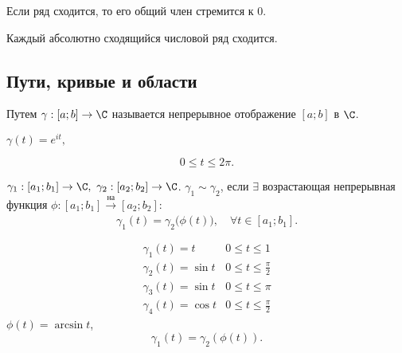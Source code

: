 \begin{corollary}
	Если ряд сходится, то его общий член стремится к $0$.
\end{corollary}

\begin{corollary}
	Каждый абсолютно сходящийся числовой ряд сходится.
\end{corollary}

\subsection{Пути, кривые и области}

\begin{definition}[Путь]
	Путем $\gamma:[a ; b] \rightarrow \C$ называется непрерывное отображение $[a ; b]$ в $\C$.
\end{definition}

\begin{eg}
	$\gamma(t) = e^{it},$
	\begin{multicols}{2}
		\begin{figure}[H]
			\centering
			\label{fig:fig-7}
		\end{figure}

		\columnbreak

		\[
			0 \leqslant t \leqslant 2\pi.
		\]
	\end{multicols}
\end{eg}

\begin{definition}
	$\gamma_1 : [a_1 ; b_1] \rightarrow \C, \ \gamma_2 : [a_2 ; b_2] \rightarrow \C$. $\gamma_1 \sim \gamma_2$, если $\exists $ возрастающая непрерывная функция $\phi: [a_1 ; b_1] \xrightarrow[]{\text{на}} [a_2 ; b_2]:$
	\[
		\gamma_1(t) = \gamma_2\big(\phi(t)\big), \quad \forall t \in [a_1 ; b_1].
	\]
\end{definition}

\begin{eg}
	\begin{multicols}{2}
		\[
			\begin{array}{ll}
				\gamma_1(t) = t      & 0 \leqslant t \leqslant 1             \\
				\gamma_2(t) = \sin t & 0 \leqslant t \leqslant \frac{\pi}{2} \\
				\gamma_3(t) = \sin t & 0 \leqslant t \leqslant \pi           \\
				\gamma_4(t) = \cos t & 0 \leqslant t \leqslant \frac{\pi}{2}
			\end{array}
		\]
		$\phi(t) = \arcsin t$,
		\[
			\gamma_1(t) = \gamma_2\left(\phi(t)\right).
		\]
		\begin{figure}[H]
			\centering
			\label{fig:fig-8}
		\end{figure}
	\end{multicols}
\end{eg}

